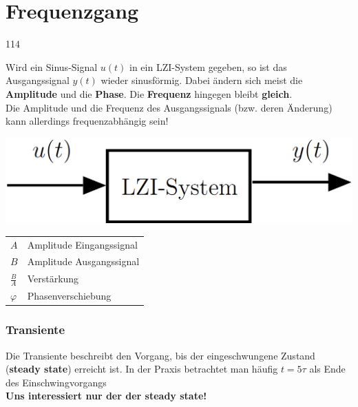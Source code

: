 \section{Frequenzgang}{114} 

Wird ein Sinus-Signal $u(t)$ in ein LZI-System gegeben, so ist das Ausgangssignal $y(t)$ wieder sinusförmig.
Dabei ändern sich meist die \textbf{Amplitude} und die \textbf{Phase}.
Die \textbf{Frequenz} hingegen bleibt \textbf{gleich}.\\
Die Amplitude und die Frequenz des Ausgangssignals (bzw. deren Änderung) kann allerdings frequenzabhängig sein!

\begin{minipage}[c]{0.48\columnwidth}
    \includegraphics[width=\columnwidth]{images/lzi_system.png}
\end{minipage}
\hfill
\begin{minipage}[c]{0.48\columnwidth}
    \begin{tabular}{ll}
        $A$             & Amplitude Eingangssignal \\
        $B$             & Amplitude Ausgangssignal \\
        $\frac{B}{A}$   & Verstärkung \\
        $\varphi$       & Phasenverschiebung \\
    \end{tabular}
\end{minipage}


\subsubsection{Transiente}

 Die Transiente beschreibt den Vorgang, bis der eingeschwungene Zustand (\textbf{steady state}) erreicht ist.
 In der Praxis betrachtet man häufig $t = 5 \tau$ als Ende des Einschwingvorgangs \\
 \textrightarrow \textbf{Uns interessiert nur der der steady state!}


